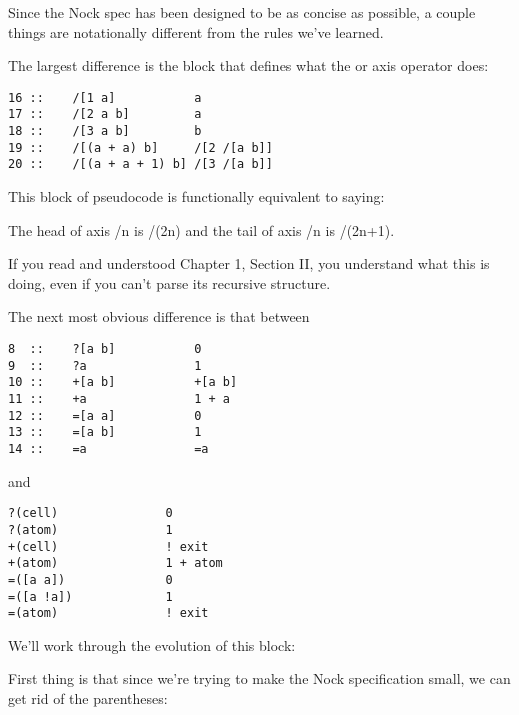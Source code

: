 Since the Nock spec has been designed to be as concise as possible, a couple things are notationally different from the rules we've learned. 

The largest difference is the block that defines what the \kode{/} or axis operator does:

\begin{framed_shaded}
\begin{Verbatim}[fontsize=\relsize{-2.5},fontseries=b,commandchars=\\\{\}]
16 ::    /[1 a]           a
17 ::    /[2 a b]         a
18 ::    /[3 a b]         b
19 ::    /[(a + a) b]     /[2 /[a b]]
20 ::    /[(a + a + 1) b] /[3 /[a b]]
\end{Verbatim}
\end{framed_shaded}
This block of pseudocode is functionally equivalent to saying:

The head of axis /n is /(2n) and the tail of axis /n is /(2n+1). 

If you read and understood Chapter 1, Section II, you understand what this is doing, even if you can't parse its recursive structure.

The next most obvious difference is that between

\begin{framed_shaded}
\begin{Verbatim}[fontsize=\relsize{-2.5},fontseries=b,commandchars=\\\{\}]
8  ::    ?[a b]           0
9  ::    ?a               1
10 ::    +[a b]           +[a b]
11 ::    +a               1 + a
12 ::    =[a a]           0
13 ::    =[a b]           1
14 ::    =a               =a
\end{Verbatim}
\end{framed_shaded}
and 

\begin{framed_shaded}
\begin{Verbatim}[fontsize=\relsize{-2.5},fontseries=b,commandchars=\\\{\}]
?(cell)               0
?(atom)               1
+(cell)               ! exit
+(atom)               1 + atom
=([a a])              0 
=([a !a])             1
=(atom)               ! exit
\end{Verbatim}
\end{framed_shaded}
We'll work through the evolution of this block:

First thing is that since we're trying to make the Nock specification small, we can get rid of the parentheses:

